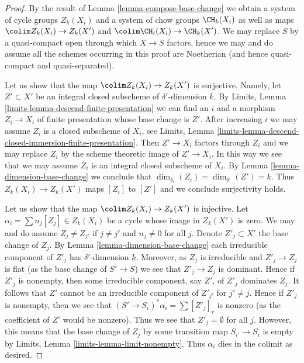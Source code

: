 \begin{proof}
By the result of Lemma \ref{lemma-compose-base-change} we obtain
a system of cycle groups $Z_k(X_i)$ and a system of
chow groups $\CH_k(X_i)$ as well as maps
$\colim Z_k(X_i) \to Z_k(X')$ and $\colim \CH_i(X_i) \to \CH_k(X')$.
We may replace $S$ by a quasi-compact open through which $X \to S$
factors, hence we may and do assume all the schemes occurring in
this proof are Noetherian (and hence quasi-compact and quasi-separated).

\medskip\noindent
Let us show that the map $\colim Z_k(X_i) \to Z_k(X')$ is surjective.
Namely, let $Z' \subset X'$
be an integral closed subscheme of $\delta'$-dimension $k$. By
Limits, Lemma \ref{limits-lemma-descend-finite-presentation}
we can find an $i$ and a morphism $Z_i \to X_i$ of finite presentation
whose base change is $Z'$. After increasing $i$ we may assume $Z_i$
is a closed subscheme of $X_i$, see
Limits, Lemma \ref{limits-lemma-descend-closed-immersion-finite-presentation}.
Then $Z' \to X_i$ factors through $Z_i$ and we may replace $Z_i$
by the scheme theoretic image of $Z' \to X_i$. In this way we see
that we may assume $Z_i$ is an integral closed subscheme of $X_i$.
By Lemma \ref{lemma-dimension-base-change} we conclude that
$\dim_{\delta_i}(Z_i) = \dim_{\delta'}(Z') = k$.
Thus $Z_k(X_i) \to Z_k(X')$ maps $[Z_i]$ to $[Z']$ and
we conclude surjectivity holds.

\medskip\noindent
Let us show that the map $\colim Z_k(X_i) \to Z_k(X')$ is injective.
Let $\alpha_i = \sum n_j[Z_j] \in Z_k(X_i)$ be a cycle whose image
in $Z_k(X')$ is zero. We may and do assume $Z_j \not = Z_{j'}$ if
$j \not = j'$ and $n_j \not = 0$ for all $j$.
Denote $Z'_j \subset X'$ the base change of $Z_j$.
By Lemma \ref{lemma-dimension-base-change} each irreducible component
of $Z'_j$ has $\delta'$-dimension $k$. Moreover, as $Z_j$ is irreducible
and $Z'_j \to Z_j$ is flat (as the base change of $S' \to S$)
we see that $Z'_j \to Z_j$ is dominant.
Hence if $Z'_j$ is nonempty, then some irreducible component, say
$Z'$, of $Z'_j$ dominates $Z_j$. It follows that $Z'$
cannot be an irreducible component of $Z'_{j'}$ for $j' \not = j$.
Hence if $Z'_j$ is nonempty, then we see that $(S' \to S_i)^*\alpha_i
= \sum [Z'_j]_r$ is nonzero (as the coefficient of $Z'$ would be nonzero).
Thus we see that $Z'_j = \emptyset$ for all $j$. However, this means
that the base change of $Z_j$ by some transition map $S_{i'} \to S_i$
is empty by Limits, Lemma \ref{limits-lemma-limit-nonempty}.
Thus $\alpha_i$ dies in the colimit as desired.


\end{proof}
